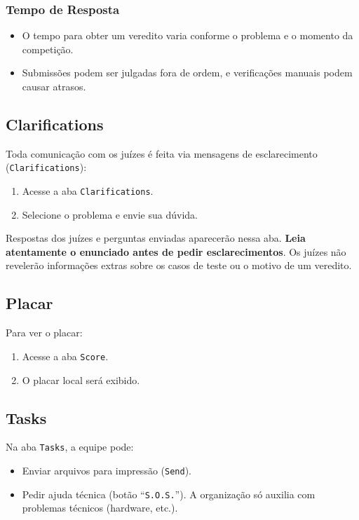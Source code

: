 \documentclass{article}
\begin{document}
\begin{titlepage}
\subsubsection{Tempo de Resposta}

\begin{itemize}
    \item O tempo para obter um veredito varia conforme o problema e o momento da competição.
    \item Submissões podem ser julgadas fora de ordem, e verificações manuais podem causar atrasos.
\end{itemize}

\subsection{Clarifications}

Toda comunicação com os juízes é feita via mensagens de esclarecimento (\texttt{Clarifications}):

\begin{enumerate}
    \item Acesse a aba \texttt{Clarifications}.
    \item Selecione o problema e envie sua dúvida.
\end{enumerate}

\noindent Respostas dos juízes e perguntas enviadas aparecerão nessa aba. \textbf{Leia atentamente o enunciado antes de pedir esclarecimentos}. Os juízes não revelerão informações extras sobre os casos de teste ou o motivo de um veredito.

\subsection{Placar}

Para ver o placar:

\begin{enumerate}
    \item Acesse a aba \texttt{Score}.
    \item O placar local será exibido.
\end{enumerate}

\subsection{Tasks}

Na aba \texttt{Tasks}, a equipe pode:

\begin{itemize}
    \item Enviar arquivos para impressão (\texttt{Send}).
    \item Pedir ajuda técnica (botão ``\texttt{S.O.S.}''). A organização só auxilia com problemas técnicos (hardware, etc.).
\end{itemize}

\end{titlepage}
\end{document}
